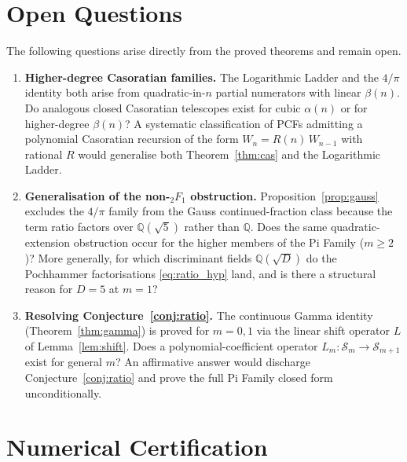 \documentclass[11pt,a4paper]{article}
\theoremstyle{plain}
\theoremstyle{definition}
\theoremstyle{remark}
\begin{document}
\section{Open Questions}\label{sec:open}

The following questions arise directly from the proved theorems and remain
open.

\begin{enumerate}
\item \textbf{Higher-degree Casoratian families.}
The Logarithmic Ladder and the $4/\pi$ identity both arise from
quadratic-in-$n$ partial numerators with linear $\beta(n)$. Do
analogous closed Casoratian telescopes exist for cubic
$\alpha(n)$ or for higher-degree $\beta(n)$? A systematic
classification of PCFs admitting a polynomial Casoratian recursion
of the form $W_n = R(n)\,W_{n-1}$ with rational $R$ would generalise
both Theorem~\ref{thm:cas} and the Logarithmic Ladder.

\item \textbf{Generalisation of the non-${}_2F_1$ obstruction.}
Proposition~\ref{prop:gauss} excludes the $4/\pi$ family from the
Gauss continued-fraction class because the term ratio factors over
$\mathbb{Q}(\sqrt{5})$ rather than $\mathbb{Q}$. Does the same
quadratic-extension obstruction occur for the higher members of
the Pi Family ($m\ge 2$)? More generally, for which discriminant
fields $\mathbb{Q}(\sqrt{D})$ do the Pochhammer factorisations
\eqref{eq:ratio_hyp} land, and is there a structural reason
for $D=5$ at $m=1$?

\item \textbf{Resolving Conjecture~\ref{conj:ratio}.}
The continuous Gamma identity (Theorem~\ref{thm:gamma}) is proved
for $m=0,1$ via the linear shift operator $L$ of
Lemma~\ref{lem:shift}. Does a polynomial-coefficient operator
$L_m\colon \mathcal{S}_m\to\mathcal{S}_{m+1}$ exist for general
$m$? An affirmative answer would discharge
Conjecture~\ref{conj:ratio} and prove the full Pi Family closed form
unconditionally.
\end{enumerate}

\appendix
\section{Numerical Certification}\label{sec:cert}
\end{document}
